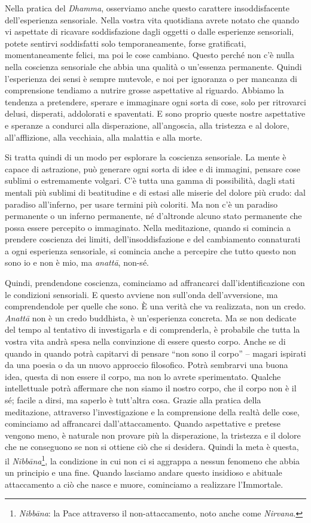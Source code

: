 Nella pratica del \textit{Dhamma}, osserviamo anche questo carattere
insoddisfacente dell'esperienza sensoriale. Nella vostra vita quotidiana
avrete notato che quando vi aspettate di ricavare soddisfazione dagli
oggetti o dalle esperienze sensoriali, potete sentirvi soddisfatti solo
temporaneamente, forse gratificati, momentaneamente felici, ma poi le
cose cambiano. Questo perché non c'è nulla nella coscienza sensoriale
che abbia una qualità o un'essenza permanente. Quindi l'esperienza dei
sensi è sempre mutevole, e noi per ignoranza o per mancanza di
comprensione tendiamo a nutrire grosse aspettative al riguardo. Abbiamo
la tendenza a pretendere, sperare e immaginare ogni sorta di cose, solo
per ritrovarci delusi, disperati, addolorati e spaventati. E sono
proprio queste nostre aspettative e speranze a condurci alla
disperazione, all'angoscia, alla tristezza e al dolore, all'afflizione,
alla vecchiaia, alla malattia e alla morte.

Si tratta quindi di un modo per esplorare la coscienza sensoriale. La
mente è capace di astrazione, può generare ogni sorta di idee e di
immagini, pensare cose sublimi o estremamente volgari. C'è tutta una
gamma di possibilità, dagli stati mentali più sublimi di beatitudine e
di estasi alle miserie del dolore più crudo: dal paradiso all'inferno,
per usare termini più coloriti. Ma non c'è un paradiso permanente o un
inferno permanente, né d'altronde alcuno stato permanente che possa
essere percepito o immaginato. Nella meditazione, quando si comincia a
prendere coscienza dei limiti, dell'insoddisfazione e del cambiamento
connaturati a ogni esperienza sensoriale, si comincia anche a percepire
che tutto questo non sono io e non è mio, ma \textit{anattā}, non-sé.

Quindi, prendendone coscienza, cominciamo ad affrancarci
dall'identificazione con le condizioni sensoriali. E questo avviene non
sull'onda dell'avversione, ma comprendendole per quelle che sono. È una
verità che va realizzata, non un credo. \textit{Anattā} non è un credo buddhista,
è un'esperienza concreta. Ma se non dedicate del tempo al tentativo di
investigarla e di comprenderla, è probabile che tutta la vostra vita
andrà spesa nella convinzione di essere questo corpo. Anche se di quando
in quando potrà capitarvi di pensare ``non sono il corpo'' – magari
ispirati da una poesia o da un nuovo approccio filosofico. Potrà
sembrarvi una buona idea, questa di non essere il corpo, ma non lo
avrete sperimentato. Qualche intellettuale potrà affermare che non siamo
il nostro corpo, che il corpo non è il sé; facile a dirsi, ma saperlo è
tutt'altra cosa. Grazie alla pratica della meditazione, attraverso
l'investigazione e la comprensione della realtà delle cose, cominciamo
ad affrancarci dall'attaccamento. Quando aspettative e pretese vengono
meno, è naturale non provare più la disperazione, la tristezza e il
dolore che ne conseguono se non si ottiene ciò che si desidera. Quindi
la meta è questa, il \textit{Nibbāna}\footnote{\textit{Nibbāna}: la Pace attraverso il non-attaccamento, noto
anche come \textit{Nirvana}.}, la condizione in cui non ci si
aggrappa a nessun fenomeno che abbia un principio e una fine. Quando
lasciamo andare questo insidioso e abituale attaccamento a ciò che nasce
e muore, cominciamo a realizzare l'Immortale.

